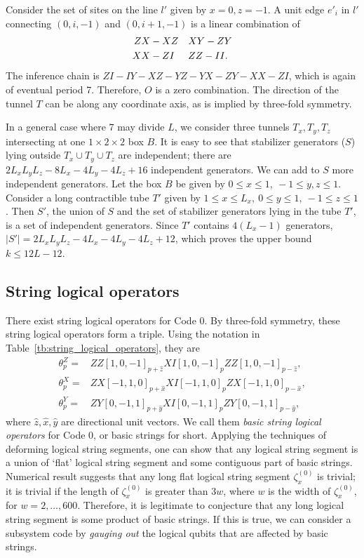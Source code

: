 \documentclass[letterpaper,10pt,pra,aps,showpacs,twocolumn]{revtex4-1}
\theoremstyle{definition} \newtheorem{defn}{Definition}
\theoremstyle{definition} \newtheorem{remark}{Remark}
\begin{document}
Consider the set of sites on the line $l'$ given by $x=0,z=-1$. A unit edge $e'_i$ in $l'$ connecting $(0,i,-1)$ and $(0,i+1,-1)$ is a linear combination of
\begin{align*}
 ZX &- XZ & &
 XY - ZY  \notag \\
 XX &- ZI & &
 ZZ - II .
\end{align*}
The inference chain is $ZI - IY - XZ - YZ - YX - ZY - XX - ZI$, which is again of eventual period 7. Therefore, $O$ is a zero combination. The direction of the tunnel $T$ can be along any coordinate axis, as is implied by three-fold symmetry.

In a general case where $7$ may divide $L$, we consider three tunnels $T_x, T_y, T_z$ intersecting at one $1 \times 2 \times 2$ box $B$. It is easy to see that stabilizer generators ($S$) lying outside $T_x \cup T_y \cup T_z$ are independent; there are $2 L_x L_y L_z - 8 L_x - 4 L_y - 4 L_z + 16$ independent generators. We can add to $S$ more independent generators. Let the box $B$ be given by $ 0 \leq x \leq 1, ~ -1 \leq y,z \leq 1$. Consider a long contractible tube $T'$ given by $ 1 \leq x \leq L_x, ~ 0 \leq y \leq 1, ~ -1 \leq z \leq 1$. Then $S'$, the union of $S$ and the set of stabilizer generators lying in the tube $T'$, is a set of independent generators. Since $T'$ contains $4(L_x-1)$ generators, $|S'| = 2 L_x L_y L_z - 4 L_x - 4 L_y - 4 L_z + 12$, which proves the upper bound $ k \leq 12L -12$.

\subsection{String logical operators}

There exist string logical operators for Code 0. By three-fold symmetry, these string logical operators form a triple. Using the notation in Table~\ref{tb:string_logical_operators}, they are
\begin{eqnarray*}
\theta^Z_{p} =
 & ZZ[1,0,-1]_{p+\hat{z}} XI[1,0,-1]_{p} ZZ[1,0,-1]_{p-\hat{z}} , \\
\theta^X_{p} = 
 & ZX[-1,1,0]_{p+\hat{x}} XI[-1,1,0]_{p} ZX[-1,1,0]_{p-\hat{x}} , \\
\theta^Y_{p} = 
 & ZY[0,-1,1]_{p+\hat{y}} XI[0,-1,1]_{p} ZY[0,-1,1]_{p-\hat{y}} ,
\end{eqnarray*}
where $\hat{z},\hat{x},\hat{y}$ are directional unit vectors. We call them \emph{basic string logical operators} for Code 0, or basic strings for short.
Applying the techniques of deforming logical string segments, one can show that any logical string segment is a union of `flat' logical string segment and some contiguous part of basic strings. Numerical result suggests that any long flat logical string segment $\zeta^{(0)}_x$ is trivial; it is trivial if the length of $\zeta^{(0)}_x$ is greater than $3w$, where $w$ is the width of $\zeta^{(0)}_x$, for $ w = 2, \ldots, 600 $. Therefore, it is legitimate to conjecture that any long logical string segment is some product of basic strings. If this is true, we can consider a subsystem code by \emph{gauging out} the logical qubits that are affected by basic strings.
\end{document}
